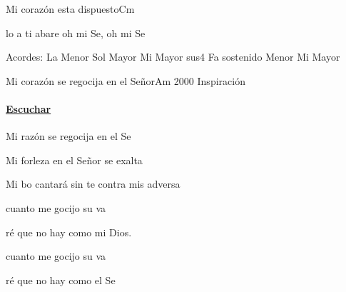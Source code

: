 \documentclass[12pt, spanish]{book}
\begin{document}
\begin{song}{Mi corazón esta dispuesto}{Cm}
\begin{SBExtraKeys}
{\begin{SBChorus}
                lo a ti abare oh mi Se, oh mi Se
            \end{SBChorus}

            \ifChordBk
            \begin{SBOpGroup}
                Acordes:\break
                \upchord{\Am}\qquad La Menor \hfill
                \upchord{\G}\qquad Sol Mayor \hfill\null\break
                \upchord{\Esus}\qquad Mi Mayor sus4 \hfill
                \upchord{\Fsm}Fa sostenido Menor \hfill
                \upchord{\E}\qquad Mi Mayor \hfill
            \end{SBOpGroup}
            \fi
        }\end{SBExtraKeys}
    \end{song}

    \begin{song}{Mi corazón se regocija en el Señor}{Am}
    {2000} %
    {Inspiración}
    {} %
    {}
        \ifChordBk
            \paragraph{\mbox{}\hfill\protect\href{https://open.spotify.com/intl-es/track/6jpUq8t6XhYk9lFXzltnaT}{Escuchar}\mbox{}\hfill}
        \fi


        \begin{SBOpGroup}
            Mi razón se regocija en el Se

            Mi forleza en el Señor se exalta

            Mi bo cantará sin te contra mis adversa
        \end{SBOpGroup}
        \vskip 20pt
        \begin{SBOpGroup}
             cuanto me gocijo  su va

            ré que no hay  como mi Dios.

             cuanto me gocijo  su va

            ré que no hay  como el Se
        \end{SBOpGroup}


\end{song}
\end{document}
